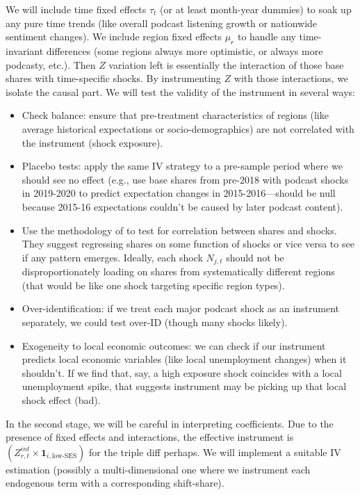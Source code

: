 \documentclass[12pt]{article}
\begin{document}
We will include time fixed effects $\tau_t$ (or at least month-year dummies) to soak up any pure time trends (like overall podcast listening growth or nationwide sentiment changes). We include region fixed effects $\mu_r$ to handle any time-invariant differences (some regions always more optimistic, or always more podcasty, etc.). Then $Z$ variation left is essentially the interaction of those base shares with time-specific shocks. By instrumenting $Z$ with those interactions, we isolate the causal part.
We will test the validity of the instrument in several ways:

\begin{itemize}
    \item Check balance: ensure that pre-treatment characteristics of regions (like average historical expectations or socio-demographics) are not correlated with the instrument (shock exposure).
    \item Placebo tests: apply the same IV strategy to a pre-sample period where we should see no effect (e.g., use base shares from pre-2018 with podcast shocks in 2019-2020 to predict expectation changes in 2015-2016—should be null because 2015-16 expectations couldn't be caused by later podcast content).
    \item Use the methodology of \citet{Adao2019} to test for correlation between shares and shocks. They suggest regressing shares on some function of shocks or vice versa to see if any pattern emerges. Ideally, each shock $N_{j,t}$ should not be disproportionately loading on shares from systematically different regions (that would be like one shock targeting specific region types).
    \item Over-identification: if we treat each major podcast shock as an instrument separately, we could test over-ID (though many shocks likely).
    \item Exogeneity to local economic outcomes: we can check if our instrument predicts local economic variables (like local unemployment changes) when it shouldn't. If we find that, say, a high exposure shock coincides with a local unemployment spike, that suggests instrument may be picking up that local shock effect (bad).
\end{itemize}

In the second stage, we will be careful in interpreting coefficients. Due to the presence of fixed effects and interactions, the effective instrument is $\left(Z^{int}_{r,t} \times \mathbf{1}_{i,\text{low-SES}}\right)$ for the triple diff perhaps. We will implement a suitable IV estimation (possibly a multi-dimensional one where we instrument each endogenous term with a corresponding shift-share).
\end{document}
